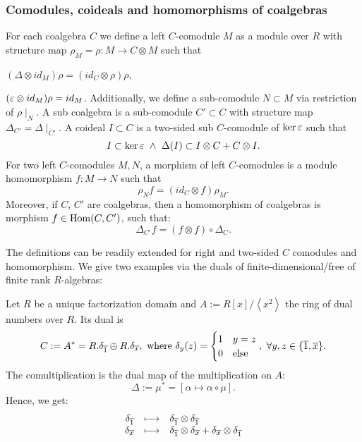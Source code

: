 \subsubsection{Comodules, coideals and homomorphisms of coalgebras}
\begin{defi}\label{defi10}
For each coalgebra $C$ we define a left $C$-comodule $M$ as a module over $R$ with structure map $\rho_M = \rho : M \longrightarrow C \otimes M$ such that
\bn
\item $(\Delta \otimes id_M) \rho = (id_C \otimes \rho)\rho$,
\item $(\eps \otimes id_M) \rho = id_M$.
\en
Additionally, we define a sub-comodule $N \subset M$ via restriction of $\rho\mid_N$. A sub coalgebra is a sub-comodule $C' \subset C$ with structure map $\Delta_{C'} = \Delta\mid_{C'}$. A coideal $I \subset C$ is a two-sided sub $C$-comodule of $\ker \eps$ such that
$$I \subset \ker \eps \ \wedge \ \Delta(I) \subset I \otimes C + C \otimes I.$$
For two left $C$-comodules $M, N$, a morphism of left $C$-comodules is a module homomorphism $f : M \longrightarrow N$ such that
$$\rho_N f = (id_C \otimes f) \rho_M.$$
Moreover, if $C$, $C'$ are coalgebras, then a homomorphism of coalgebras is morphism $f \in \trm{Hom}(C, C')$, such that:
$$\Delta_{C'} f = (f \otimes f) \circ \Delta_C.$$
\end{defi}
The definitions can be readily extended for right and two-sided $C$ comodules and homomorphism.
\bsp \label{coalg_example} We give two examples via the duals of finite-dimensional/free of finite rank $R$-algebras:
\bn
\item \label{coalg01} Let $R$ be a unique factorization domain and $A := R[x]/\left<x^2\right>$ the ring of dual numbers over $R$. Its dual is
$$C := A^* = R.\delta_{\ov{1}} \oplus R.\delta_{\ov{x}},\ \trm{where}\ \delta_y(z) = \begin{cases}
1 & y = z\\
0 &\trm{else}\\
\end{cases},\ \forall y, z \in \{\ov{1},\ov{x}\}.$$
The comultiplication is the dual map of the multiplication on $A$:
$$\Delta := \mu^* = \left[\alpha \longmapsto \alpha \circ \mu\right].$$
Hence, we get:
$$\bao{rcl}
\delta_{\ov{1}} &\longmapsto& \delta_{\ov{1}} \otimes \delta_{\ov{1}}\\
\delta_{\ov{x}} &\longmapsto& \delta_{\ov{1}} \otimes \delta_{\ov{x}} + \delta_{\ov{x}} \otimes \delta_{\ov{1}}\\
\ea$$
